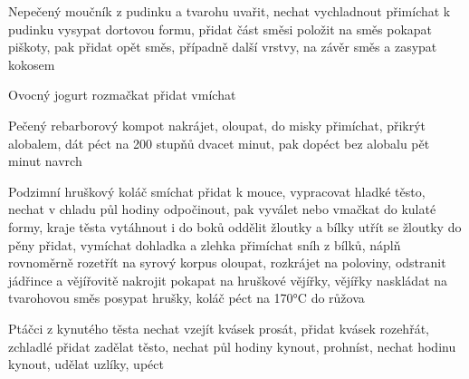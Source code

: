 \documentclass[12pt,a4paper]{article}
\begin{document}
\begin{recipe}{Nepečený moučník z pudinku a tvarohu}
   uvařit, nechat vychladnout
   přimíchat k pudinku
   vysypat dortovou formu, přidat část směsi
   položit na směs
   pokapat piškoty, pak přidat opět směs, případně další vrstvy, na závěr směs a zasypat kokosem
\end{recipe}
\newpage

\begin{recipe}{Ovocný jogurt}
   rozmačkat
   přidat
   vmíchat
\end{recipe}
\newpage

\begin{recipe}{Pečený rebarborový kompot}
   nakrájet, oloupat, do misky
   přimíchat, přikrýt alobalem, dát péct na 200 stup\-ňů dvacet minut, pak dopéct bez alobalu pět minut
   navrch
\end{recipe}
\newpage

\begin{recipe}{Podzimní hruškový koláč}
   smíchat
   přidat k mouce, vypracovat hladké těsto, nechat v chladu půl hodiny odpočinout, pak vyválet nebo vmačkat do kulaté formy, kraje těsta vytáhnout i do boků
   oddělit žloutky a bílky
   utřít se žloutky do pěny
   přidat, vymíchat dohladka a zlehka přimíchat sníh z bílků, náplň rovnoměrně rozetřít na syrový korpus
   oloupat, rozkrájet na poloviny, odstranit jádřince a vějířovitě nakrojit
   pokapat na hruškové vějířky, vějířky naskládat na tvarohovou směs
   posypat hrušky, koláč péct na 170°C do růžova
\end{recipe}
\newpage

\begin{recipe}{Ptáčci z kynutého těsta}
   nechat vzejít kvásek
   prosát, přidat kvásek
   rozehřát, zchladlé přidat
   zadělat těsto, nechat půl hodiny kynout, prohníst, nechat hodinu kynout, udělat uzlíky, upéct
\end{recipe}
\newpage
\end{document}
